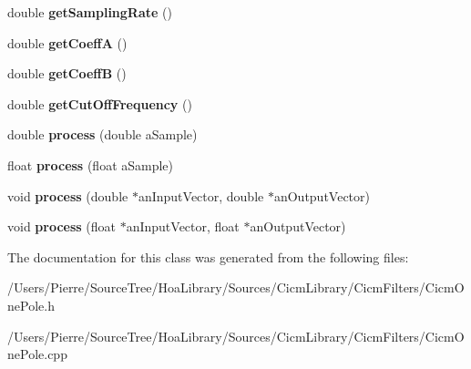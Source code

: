 \begin{DoxyCompactItemize}
\item 
\hypertarget{class_ambisonic_one_pole_af7df581cfa2eff69d5915e1599d30e7d}{double {\bfseries get\-Sampling\-Rate} ()}\label{class_ambisonic_one_pole_af7df581cfa2eff69d5915e1599d30e7d}

\item 
\hypertarget{class_ambisonic_one_pole_a0ba41d8f4b3b796381ccf6cae6d1e84b}{double {\bfseries get\-Coeff\-A} ()}\label{class_ambisonic_one_pole_a0ba41d8f4b3b796381ccf6cae6d1e84b}

\item 
\hypertarget{class_ambisonic_one_pole_a58d8f5c8750073642bab6ea9b6ab7407}{double {\bfseries get\-Coeff\-B} ()}\label{class_ambisonic_one_pole_a58d8f5c8750073642bab6ea9b6ab7407}

\item 
\hypertarget{class_ambisonic_one_pole_a24849fc2dacbaa771f5eda2fb17dc7b4}{double {\bfseries get\-Cut\-Off\-Frequency} ()}\label{class_ambisonic_one_pole_a24849fc2dacbaa771f5eda2fb17dc7b4}

\item 
\hypertarget{class_ambisonic_one_pole_ace0280e206dc58416397cf7880302131}{double {\bfseries process} (double a\-Sample)}\label{class_ambisonic_one_pole_ace0280e206dc58416397cf7880302131}

\item 
\hypertarget{class_ambisonic_one_pole_a40da92811bd0f8be3e277c615cf7dd32}{float {\bfseries process} (float a\-Sample)}\label{class_ambisonic_one_pole_a40da92811bd0f8be3e277c615cf7dd32}

\item 
\hypertarget{class_ambisonic_one_pole_af5a35d307cdeffbe0af66b4e4b94178f}{void {\bfseries process} (double $\ast$an\-Input\-Vector, double $\ast$an\-Output\-Vector)}\label{class_ambisonic_one_pole_af5a35d307cdeffbe0af66b4e4b94178f}

\item 
\hypertarget{class_ambisonic_one_pole_a575cf9391b07f65f52d570a2463b30ce}{void {\bfseries process} (float $\ast$an\-Input\-Vector, float $\ast$an\-Output\-Vector)}\label{class_ambisonic_one_pole_a575cf9391b07f65f52d570a2463b30ce}

\end{DoxyCompactItemize}


The documentation for this class was generated from the following files\-:\begin{DoxyCompactItemize}
\item 
/\-Users/\-Pierre/\-Source\-Tree/\-Hoa\-Library/\-Sources/\-Cicm\-Library/\-Cicm\-Filters/Cicm\-One\-Pole.\-h\item 
/\-Users/\-Pierre/\-Source\-Tree/\-Hoa\-Library/\-Sources/\-Cicm\-Library/\-Cicm\-Filters/Cicm\-One\-Pole.\-cpp\end{DoxyCompactItemize}
